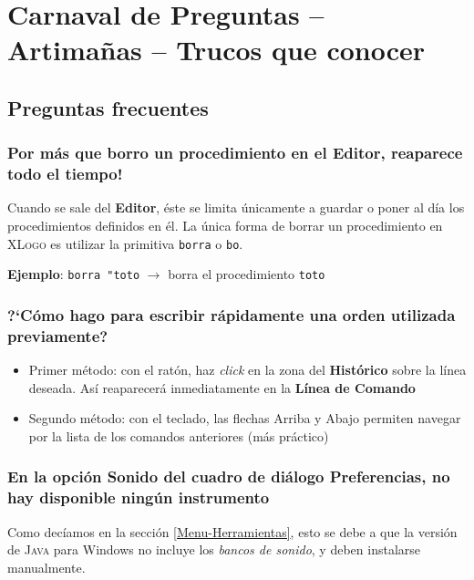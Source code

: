 \chapter{Carnaval de Preguntas -- Artima\~nas -- Trucos que conocer}
   \label{PreguntasFrecuentes}

\section{Preguntas frecuentes}

\subsection*{Por m\'as que borro un procedimiento en el Editor, reaparece
            todo el tiempo!}
   \label{Borrar-Editor}

Cuando se sale del \textbf{Editor}, \'este se limita \'unicamente a guardar
o poner al d\'ia los procedimientos definidos en \'el. La \'unica forma
de borrar un procedimiento en \textsc{XLogo} es utilizar la primitiva
\texttt{borra} o \texttt{bo}.

\textbf{Ejemplo}: \verb+borra "toto+ $\rightarrow$ borra
el procedimiento \texttt{toto}


\subsection*{?`C\'omo hago para escribir r\'apidamente una orden utilizada
            previamente?}
    \label{Recuperar-Ordenes}

\begin{itemize}
   \item Primer m\'etodo: con el rat\'on, haz \textit{click} en la zona del
      \textbf{Hist\'orico} sobre la l\'inea deseada. As\'i reaparecer\'a
      inmediatamente en la \textbf{L\'inea de Comando}
   \item Segundo m\'etodo: con el teclado, las flechas Arriba y Abajo
      permiten navegar por la lista de los comandos anteriores (m\'as
      pr\'actico)
\end{itemize}

\subsection*{En la opci\'on Sonido del cuadro de di\'alogo Preferencias, 
            no hay disponible ning\'un instrumento}
   \label{Sonido-Instrumentos-Error}

Como dec\'iamos en la secci\'on \ref{Menu-Herramientas}, esto se debe
a que la versi\'on de \textsc{Java} para Windows no incluye los 
\textit{bancos de sonido}, y deben instalarse manualmente.

